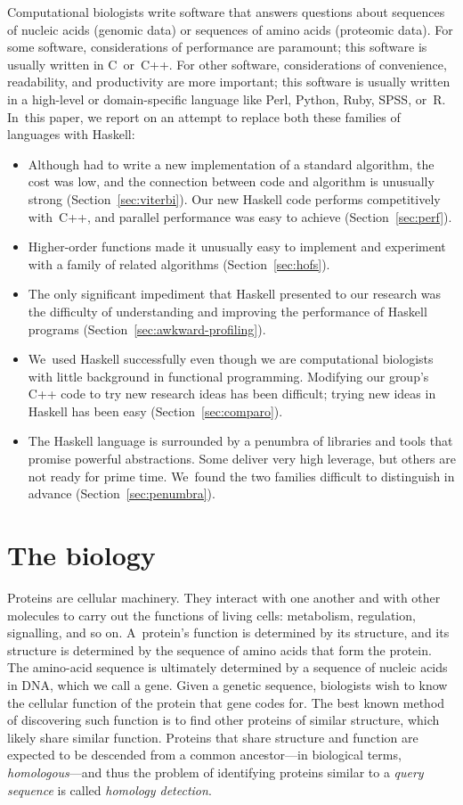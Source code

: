 \documentclass[preprint,nonatbib,blockstyle,nocopyrightspace,times]{sigplanconf}
\newcommand\secref[1]{Section~\ref{sec:#1}}
\begin{document}
Computational biologists write software that answers questions about 
sequences of nucleic acids (genomic data) or sequences of amino 
acids (proteomic data). 
For some software, considerations of performance are paramount; this
software is usually written in C~or~C++. 
For other software, considerations of convenience, readability, and
productivity are more important;
this software is usually written in a high-level
or domain-specific language like
Perl, Python, Ruby, SPSS, or~R.
In~this paper, we report on an attempt to replace both these families
of languages with Haskell: 
\begin{itemize}
\item
Although had to write a new implementation of a standard
algorithm, the cost was low, and the connection between code and
algorithm is unusually strong (\secref{viterbi}).
Our new Haskell code performs competitively with~C++,
and parallel performance was easy to achieve
(\secref{perf}). 
\item
Higher-order functions made it unusually easy to
implement and experiment with a family of related algorithms
(\secref{hofs}).
\item
The only significant impediment that Haskell presented to our
research was the difficulty of understanding and improving the
performance of Haskell programs (\secref{awkward-profiling}).
\item
We~used Haskell successfully even though we are computational
biologists with little background in functional programming.
Modifying our group's C++ code to try new research ideas has been
difficult;
trying new ideas in Haskell has been easy
(\secref{comparo}).
\item
The Haskell language is surrounded by a penumbra of libraries and tools that
promise powerful abstractions.
Some deliver very high leverage, but others are not ready for prime
time.
We~found the two families difficult to distinguish in advance (\secref{penumbra}).
\end{itemize}




\section{The biology}

Proteins are cellular machinery. They interact with one another and with other 
molecules to carry out the functions of living cells: metabolism, regulation, 
signalling, and so on.
A~protein's function is determined by its structure, 
and its structure is determined by the sequence of amino acids that
form the protein.
The amino-acid sequence is ultimately determined by a sequence of
nucleic acids in DNA, which we call a gene.
Given a genetic sequence, biologists wish to know the cellular
function of the protein that gene codes for.
The best known method of discovering such function is
to find other proteins of 
similar structure, which likely share similar function.
Proteins that share structure and function are expected to be
descended from a common ancestor---in biological terms, \emph{homologous}---and
thus
the problem of identifying proteins similar to a \textit{query sequence} is called 
\textit{homology detection}.
\end{document}
